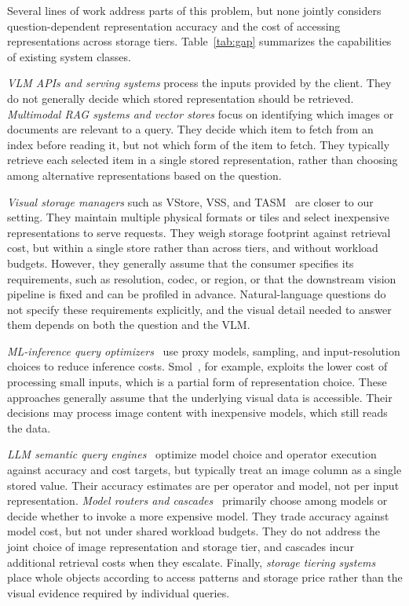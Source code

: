 \documentclass[10pt,conference]{IEEEtran}
\begin{document}
Several lines of work address parts of this problem, but none jointly considers question-dependent representation accuracy and the cost of accessing representations across storage tiers. Table~\ref{tab:gap} summarizes the capabilities of existing system classes.

\emph{VLM APIs and serving systems} process the inputs provided by the client. They do not generally decide which stored representation should be retrieved. \emph{Multimodal RAG systems and vector stores} focus on identifying which images or documents are relevant to a query. They decide which item to fetch from an index before reading it, but not which form of the item to fetch. They typically retrieve each selected item in a single stored representation, rather than choosing among alternative representations based on the question.

\emph{Visual storage managers} such as VStore, VSS, and TASM~\cite{xu2019vstore,haynes2021vss,daum2021tasm} are closer to our setting. They maintain multiple physical formats or tiles and select inexpensive representations to serve requests. They weigh storage footprint against retrieval cost, but within a single store rather than across tiers, and without workload budgets. However, they generally assume that the consumer specifies its requirements, such as resolution, codec, or region, or that the downstream vision pipeline is fixed and can be profiled in advance. Natural-language questions do not specify these requirements explicitly, and the visual detail needed to answer them depends on both the question and the VLM.

\emph{ML-inference query optimizers}~\cite{kang2017noscope,kang2020blazeit,lu2018probabilistic,kang2022tasti,kang2020smol} use proxy models, sampling, and input-resolution choices to reduce inference costs. Smol~\cite{kang2020smol}, for example, exploits the lower cost of processing small inputs, which is a partial form of representation choice. These approaches generally assume that the underlying visual data is accessible. Their decisions may process image content with inexpensive models, which still reads the data.

\emph{LLM semantic query engines}~\cite{patel2024lotus,liu2025palimpzest,jo2024thalamusdb,urban2024caesura} optimize model choice and operator execution against accuracy and cost targets, but typically treat an image column as a single stored value. Their accuracy estimates are per operator and model, not per input representation. \emph{Model routers and cascades}~\cite{chen2023frugalgpt,chen2020frugalml,wang2024routellm} primarily choose among models or decide whether to invoke a more expensive model. They trade accuracy against model cost, but not under shared workload budgets. They do not address the joint choice of image representation and storage tier, and cascades incur additional retrieval costs when they escalate. Finally, \emph{storage tiering systems}~\cite{aws_s3_intelligent_tiering} place whole objects according to access patterns and storage price rather than the visual evidence required by individual queries.
\end{document}
